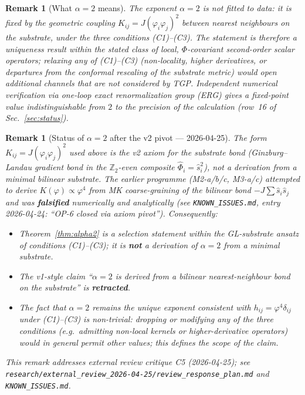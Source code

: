 \documentclass[11pt,a4paper]{article}
\renewcommand{\Phi}{\varPhi}
\newcommand{\Zp}{\mathbb{Z}_{2}}
\newtheorem{remark}[axiom]{Remark}
\begin{document}
\begin{remark}[What $\alpha=2$ means]
The exponent $\alpha=2$ is \emph{not} fitted to data: it is fixed by the
geometric coupling $K_{ij}=J(\varphi_{i}\varphi_{j})^{2}$ between nearest
neighbours on the substrate, under the three conditions (C1)--(C3). The
statement is therefore a uniqueness result \emph{within} the stated
class of local, $\Phi$-covariant second-order scalar operators; relaxing
any of (C1)--(C3) (non-locality, higher derivatives, or departures from
the conformal rescaling of the substrate metric) would open additional
channels that are not considered by TGP. Independent numerical
verification via one-loop exact renormalization group (ERG) gives a
fixed-point value indistinguishable from $2$ to the precision of the
calculation (row~16 of Sec.~\ref{sec:status}).
\end{remark}

\begin{remark}[Status of $\alpha=2$ after the v2 pivot --- 2026-04-25]
\label{rem:alpha2-pivot-status}
The form $K_{ij}=J(\varphi_i\varphi_j)^2$ used above is \emph{the v2
axiom for the substrate bond} (Ginzburg--Landau gradient bond in the
$\Zp$-even composite $\hat{\Phi}_i = \hat{s}_i^2$), \emph{not} a
derivation from a minimal bilinear substrate. The earlier programme
(M2-a/b/c, M3-a/c) attempted to derive $K(\varphi) \propto \varphi^4$
from MK coarse-graining of the bilinear bond
$-J\sum\hat{s}_i\hat{s}_j$ and was \textbf{falsified} numerically and
analytically (see \texttt{KNOWN\_ISSUES.md}, entry 2026-04-24:
``OP-6 closed via axiom pivot''). Consequently:
\begin{itemize}[nosep]
  \item Theorem~\ref{thm:alpha2} is a \emph{selection} statement
    within the GL-substrate ansatz of conditions (C1)--(C3); it is
    \textbf{not} a derivation of $\alpha=2$ from a minimal substrate.
  \item The v1-style claim ``$\alpha=2$ is derived from a bilinear
    nearest-neighbour bond on the substrate'' is \textbf{retracted}.
  \item The fact that $\alpha=2$ remains the unique exponent
    consistent with $h_{ij}=\varphi^{4}\delta_{ij}$ under (C1)--(C3)
    is non-trivial: dropping or modifying any of the three
    conditions (e.g.\ admitting non-local kernels or
    higher-derivative operators) would in general permit other
    values; this defines the \emph{scope} of the claim.
\end{itemize}
This remark addresses external review critique C5 (2026-04-25); see
\texttt{research/external\_review\_2026-04-25/review\_response\_plan.md}
and \texttt{KNOWN\_ISSUES.md}.
\end{remark}
\end{document}
